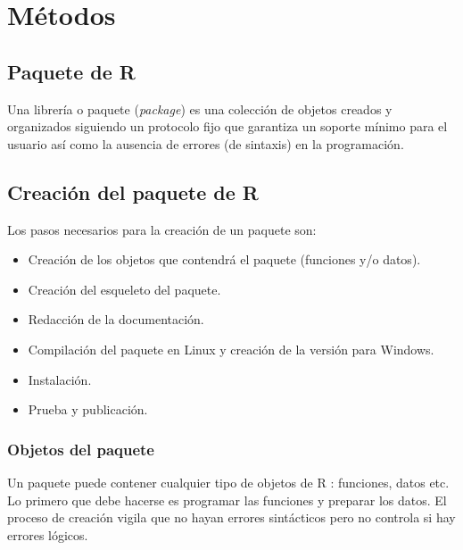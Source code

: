 


\chapter{Métodos}
\section{Paquete de R}

Una librería o paquete (\emph{package}) es una colección de objetos creados y organizados siguiendo un protocolo fijo que garantiza un soporte mínimo para el usuario así como la ausencia de errores (de sintaxis) en la programación.

\section{Creación del paquete de R}
Los pasos necesarios para la creación de un paquete son:
\begin{itemize}
\item Creación de los objetos que contendrá el paquete (funciones y/o
datos).
\item Creación del esqueleto del paquete.
\item Redacción de la documentación.
\item Compilación del paquete en Linux y creación de la versión para Windows.
\item Instalación.
\item Prueba y publicación.
\end{itemize}

\subsection{Objetos del paquete}
Un paquete puede contener cualquier tipo de objetos de R : funciones, datos etc. Lo primero que debe hacerse es programar las funciones y preparar los datos. El proceso de creación vigila que no hayan errores sintácticos pero no controla si hay errores lógicos.
 
